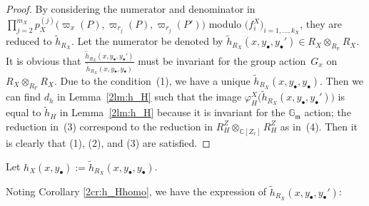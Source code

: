 \documentclass[10pt,a4paper]{amsart}
\def\CC{{\mathbb C}}
\def\GG{{\mathbb G}}
\def\PP{{\mathbb P}}
\def\fm{{\mathfrak m}}
\def\th{{\widetilde h}}
\numberwithin{equation}{section}
\begin{document}
\begin{proof}By considering the numerator and denominator in $\prod_{j=2}^{m_X}p_X^{(j)}\bigr(\varpi_x(P), \varpi_{r_j}(P),\varpi_{r_j}(P')\bigr)$ modulo $\big(f_i^X\big)_{i=1, \dots, k_X}$, they are reduced to $\th_{R_X}$.
Let the numerator be denoted by $\th_{R_X}(x, y_{\bullet}, y_{\bullet}')\allowbreak \in R_X\otimes_{R_\PP}R_X$.
It is obvious that $\frac{\th_{R_X}(x, y_{\bullet}, y_{\bullet}')}{\th_{R_X}(x, y_{\bullet}, y_{\bullet})}$ must be invariant for the group action~$G_x$ on $R_X\otimes_{R_\PP}R_X$.
Due to the condition~(1), we have a unique ${\th_{R_X}(x, y_{\bullet}, y_{\bullet})}$.
Then we can find $d_h$ in Lemma~\ref{2lm:h_H} such that the image $\varphi^X_H\big(\th_{R_X}(x, y_{\bullet}, y_{\bullet}')\big)$ is equal to $\th_{H}$ in Lemma~\ref{2lm:h_H} because it is invariant for the $\GG_\fm$ action; the reduction in~(3) correspond to the reduction in $R_H^Z\otimes_{\CC[Z_r]}R_H^Z$ as in~(4).
Then it is clearly that (1), (2), and (3) are satisfied.
\end{proof}

\begin{Definition}\label{2df:h_X00}
Let $h_{X}(x, y_{\bullet}):=\th_{R_X}(x, y_{\bullet}, y_{\bullet})$.
\end{Definition}

Noting Corollary \ref{2cr:h_Hhomo}, we have the expression of $\th_{R_X}(x, y_{\bullet}, y_{\bullet}')$:
\end{document}
